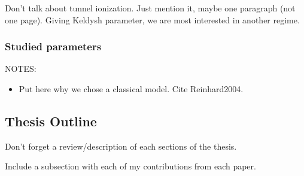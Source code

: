 Don't talk about tunnel ionization. Just mention it, maybe one paragraph (not
one page). Giving Keldysh parameter, we are most interested in another regime.


\subsubsection{Studied parameters}
NOTES:
\begin{itemize}
\item Put here why we chose a classical model. Cite
Reinhard2004\cite{Reinhard2004}.
\end{itemize}






\subsection{Thesis Outline}
Don't forget a review/description of each sections of the thesis.

Include a subsection with each of my contributions from each paper.


